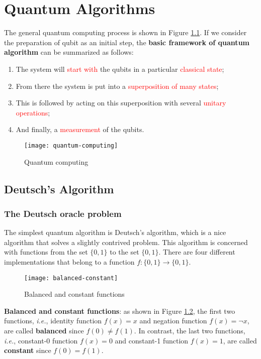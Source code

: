 \documentclass{easyclass}
\begin{document}
\else
	\chapter{Quantum Algorithms}
\fi

The general quantum computing process is shown in Figure \ref{fig:quantum computing}. If we consider the preparation of qubit as an initial step, the \textbf{basic framework of quantum algorithm} can be summarized as follows:
\begin{enumerate}[(1)]
	\item The system will \textcolor{red}{start with} the qubits in a particular \textcolor{red}{classical state};
	\item From there the system is put into a \textcolor{red}{superposition of many states};
	\item This is followed by acting on this superposition with several \textcolor{red}{unitary operations};
	\item And finally, a \textcolor{red}{measurement} of the qubits.	
\end{enumerate}

\begin{figure}[h]
	\centering
	\texttt{[image: quantum-computing]}
	\caption{Quantum computing}
	\label{fig:quantum computing}
\end{figure}	
	
\section{Deutsch's Algorithm}
\subsection{The Deutsch oracle problem}
The simplest quantum algorithm is Deutsch’s algorithm, which is a nice algorithm that solves a slightly contrived problem. This algorithm is concerned with functions from the set $\{0,1\}$ to the set $\{0,1\}$. There are four different implementations that belong to a function $f:\{0,1\}\rightarrow \{0,1\}$.

\begin{figure}[h]
	\centering
	\texttt{[image: balanced-constant]}
	\caption{Balanced and constant functions}
	\label{fig:balanced constant}
\end{figure}

\textbf{Balanced and constant functions}: as shown in Figure \ref{fig:balanced constant}, the first two functions, \textit{i.e.}, identity function $f(x)=x$ and negation function $f(x)=\neg x$, are called \textbf{balanced} since $f(0)\neq f(1)$. In contrast, the last two functions, \textit{i.e.}, constant-0 function $f(x)=0$ and constant-1 function $f(x)=1$, are called \textbf{constant} since $f(0)=f(1)$.
\end{document}
